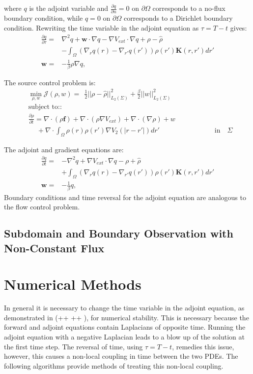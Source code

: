 \documentclass[11pt, a4paper]{article}
\theoremstyle{definition}
\newcommand{\Sta}{\rho}
\newcommand{\Adjb}{q}
\newcommand{\Con}{\mathbf{f}}
\begin{document}
where $\Adjb$ is the adjoint variable and $\frac{\partial \Adjb}{\partial n} = 0$ on $\partial \Omega$ corresponds to a no-flux boundary condition, while $\Adjb = 0$ on $\partial \Omega$ corresponds to a Dirichlet boundary condition.
Rewriting the time variable in the adjoint equation as $\tau = T-t$ gives:
\begin{align*}
\frac{\partial \Adjb}{\partial \tau} =& \nabla^2\Adjb +\mathbf{w} \cdot \nabla \Adjb - \nabla V_{ext} \cdot \nabla \Adjb + \Sta - \hat \rho \\
&-\int_\Omega (\nabla_r \Adjb(r) - \nabla_{r'} \Adjb(r') ) \rho(r') \mathbf{K}(r,r') dr'\\
\mathbf{w} =& - \frac{1}{\beta} \Sta \nabla \Adjb,
\end{align*}

The source control problem is:
\begin{align*}
&\min_{\Sta,{w} } \mathcal J(\Sta,{w}) = \ \ \frac{1}{2}||\Sta - \hat \Sta||_{L_2(\Sigma)}^2  +\frac{\beta}{2}||{w}||_{L_2(\Sigma)}^2\\
& \text{subject to:}:\\
&\frac{\partial \Sta}{\partial  t} = \nabla \cdot (\Sta\Con) + \nabla \cdot (\rho\nabla V_{ext}) + \nabla \cdot (\nabla \rho) + w \\
& \quad \ +\nabla \cdot \int_\Omega \Sta(r)\Sta(r') \nabla V_2(|r-r'|)dr' \qquad \qquad \qquad \qquad \text{in} \quad \Sigma
\end{align*}

The adjoint and gradient equations are:
\begin{align*}
\frac{\partial \Adjb}{\partial t} =& - \nabla^2 \Adjb + \nabla V_{ext} \cdot \nabla \Adjb - \Sta + \hat \rho \\
&+\int_\Omega (\nabla_r \Adjb(r) - \nabla_{r'} \Adjb(r') ) \rho(r') \mathbf{K}(r,r') dr'\\
\mathbf{w} =& - \frac{1}{\beta} \Adjb,
\end{align*}
Boundary conditions and time reversal for the adjoint equation are analogous to the flow control problem.

\subsection{Subdomain and Boundary Observation with Non-Constant Flux}


\section{Numerical Methods}
In general it is necessary to change the time variable in the adjoint equation, as demonstrated in (++ ++ ), for numerical stability. This is necessary because the forward and adjoint equations contain Laplacians of opposite time. Running the adjoint equation with a negative Laplacian leads to a blow up of the solution at the first time step. The reversal of time, using $\tau = T-t$, remedies this issue, however, this causes a non-local coupling in time between the two PDEs.
The following algorithms provide methods of treating this non-local coupling.
\end{document}
